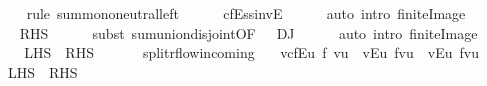 \begin{isabellebody}
\ \ \ \ \isamarkupfalse%
\ {\isacharparenleft}rule\ sum{\isachardot}mono{\isacharunderscore}neutral{\isacharunderscore}left{\isacharparenright}\isanewline
\ \ \ \ \isamarkupfalse%
\ cfE{\isacharunderscore}ss{\isacharunderscore}invE\isanewline
\ \ \ \ \isamarkupfalse%
\ {\isacharparenleft}auto\ intro{\isacharcolon}\ finite{\isacharunderscore}Image{\isacharparenright}\isanewline
\ \ \isamarkupfalse%
\ \isamarkupfalse%
\ {\isachardoublequoteopen}{\isasymdots}\ {\isacharequal}\ {\isacharquery}RHS{\isachardoublequoteclose}\isanewline
\ \ \ \ \isamarkupfalse%
\ {\isacharparenleft}subst\ sum{\isachardot}union{\isacharunderscore}disjoint{\isacharbrackleft}OF\ {\isacharunderscore}\ {\isacharunderscore}\ DJ{\isacharbrackright}{\isacharparenright}\isanewline
\ \ \ \ \isamarkupfalse%
\ {\isacharparenleft}auto\ intro{\isacharcolon}\ finite{\isacharunderscore}Image{\isacharparenright}\isanewline
\ \ \isamarkupfalse%
\ \isamarkupfalse%
\ {\isachardoublequoteopen}{\isacharquery}LHS\ {\isacharequal}\ {\isacharquery}RHS{\isachardoublequoteclose}\ \isacommand{{\isachardot}}\isamarkupfalse%
\isanewline
{}\isamarkupfalse%
\ \ \isanewline
\isanewline
{}%
\endisatagproof
{\isafoldproof}%
%
\isadelimproof
%
\endisadelimproof
\ \isamarkupfalse%
\ split{\isacharunderscore}rflow{\isacharunderscore}incoming{\isacharcolon}\ \isanewline
\ \ {\isachardoublequoteopen}{\isacharparenleft}{\isasymSum}v{\isasymin}cf{\isachardot}E{\isasyminverse}{\isacharbackquote}{\isacharbackquote}{\isacharbraceleft}u{\isacharbraceright}{\isachardot}\ f{\isacharprime}\ {\isacharparenleft}v{\isacharcomma}u{\isacharparenright}{\isacharparenright}\ {\isacharequal}\ {\isacharparenleft}{\isasymSum}v{\isasymin}E{\isacharbackquote}{\isacharbackquote}{\isacharbraceleft}u{\isacharbraceright}{\isachardot}\ f{\isacharprime}{\isacharparenleft}v{\isacharcomma}u{\isacharparenright}{\isacharparenright}\ {\isacharplus}\ {\isacharparenleft}{\isasymSum}v{\isasymin}E{\isasyminverse}{\isacharbackquote}{\isacharbackquote}{\isacharbraceleft}u{\isacharbraceright}{\isachardot}\ f{\isacharprime}{\isacharparenleft}v{\isacharcomma}u{\isacharparenright}{\isacharparenright}{\isachardoublequoteclose}\isanewline
\ \ {\isacharparenleft}\ {\isachardoublequoteopen}{\isacharquery}LHS\ {\isacharequal}\ {\isacharquery}RHS{\isachardoublequoteclose}{\isacharparenright}\isanewline
%
\isadelimproof
%
\endisadelimproof
%
\isatagproof

\end{isabellebody}
